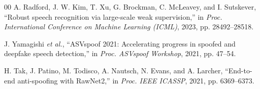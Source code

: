 \documentclass[conference]{IEEEtran}
\begin{document}
\begin{thebibliography}{00}
A. Radford, J. W. Kim, T. Xu, G. Brockman, C. McLeavey, and I. Sutskever,
``Robust speech recognition via large-scale weak supervision,''
in \emph{Proc. International Conference on Machine Learning (ICML)}, 2023,
pp. 28492--28518.

J. Yamagishi \emph{et al.},
``ASVspoof 2021: Accelerating progress in spoofed and deepfake speech
detection,'' in \emph{Proc. ASVspoof Workshop}, 2021, pp. 47--54.

H. Tak, J. Patino, M. Todisco, A. Nautsch, N. Evans, and A. Larcher,
``End-to-end anti-spoofing with RawNet2,''
in \emph{Proc. IEEE ICASSP}, 2021, pp. 6369--6373.

\end{thebibliography}
\end{document}
